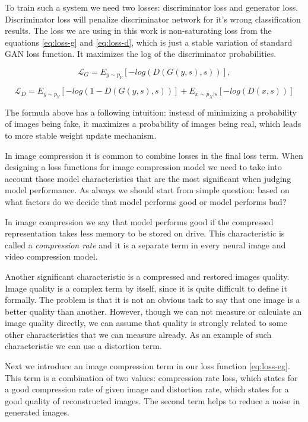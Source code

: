To train such a system we need two losses: discriminator loss and generator loss. Discriminator loss will penalize discriminator network for it's wrong classification results. The loss we are using in this work is non-saturating loss from the equations \ref{eq:loss-g} and \ref{eq:loss-d}, which is just a stable variation of standard GAN loss function. It maximizes the log of the discriminator probabilities.

\begin{equation}
    \label{eq:loss-g}
    \mathcal{L}_G=E_{y\sim p_Y}[-log(D(G(y,s),s))],
\end{equation}

\begin{equation}
    \label{eq:loss-d}
    \mathcal{L}_D=E_{y\sim p_Y}[-log(1-D(G(y,s),s))]+E_{x\sim p_X|s}[-log(D(x,s))]
\end{equation}

The formula above has a following intuition: instead of minimizing a probability of images being fake, it maximizes a probability of images being real, which leads to more stable weight update mechanism.

In image compression it is common to combine losses in the final loss term. When designing a loss functions for image compression model we need to take into account those model characteristics that are the most significant when judging model performance. As always we should start from simple question: based on what factors do we decide that model performs good or model performs bad?

In image compression we say that model performs good if the compressed representation takes less memory to be stored on drive. This characteristic is called a \textit{compression rate} and it is a separate term in every neural image and video compression model.

Another significant characteristic is a compressed and restored images quality. Image quality is a complex term by itself, since it is quite difficult to define it formally. The problem is that it is not an obvious task to say that one image is a better quality than another. However, though we can not measure or calculate an image quality directly, we can assume that quality is strongly related to some other characteristics that we can measure already. As an example of such characteristic we can use a distortion term.

Next we introduce an image compression term in our loss function \ref{eq:loss-eg}. This term is a combination of two values: compression rate loss, which states for a good compression rate of given image and distortion rate, which states for a good quality of reconstructed images. The second term helps to reduce a noise in generated images.

